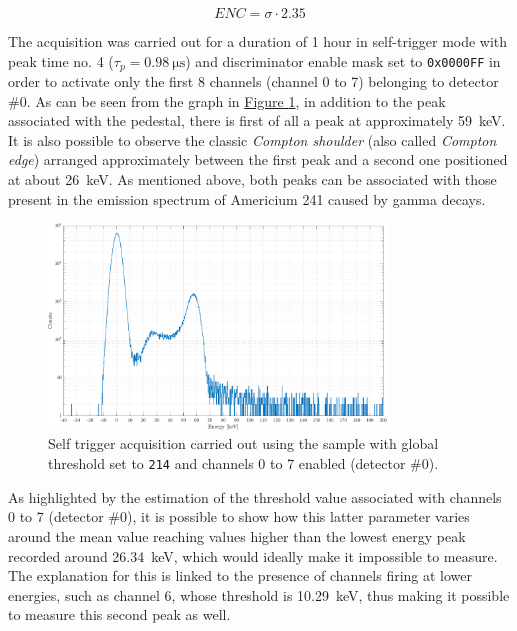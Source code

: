 \vspace{0.15cm}

\begin{equation}
    ENC = \sigma \cdot 2.35
    \label{ENCchargeScan}
\end{equation}

\par
The acquisition was carried out for a duration of 1 hour in self-trigger mode with peak time no. 4 ($\tau_{p} = \SI{0.98}{\micro\second}$) and discriminator enable mask set to \texttt{0x0000FF} in order to activate only the first 8 channels (channel 0 to 7) belonging to detector \#0. As can be seen from the graph in \hyperref[figAmericioTHR214]{Figure \ref{figAmericioTHR214}}, in addition to the peak associated with the pedestal, there is first of all a peak at approximately \SI{59}{\kilo\electronvolt}. It is also possible to observe the classic \textit{Compton shoulder} (also called \textit{Compton edge}) arranged approximately between the first peak and a second one positioned at about \SI{26}{\kilo\electronvolt}. As mentioned above, both peaks can be associated with those present in the emission spectrum of Americium 241 caused by gamma decays.

\begin{figure}[h!]
    \centering
    \includegraphics[width=0.8\textwidth]{Images/chap3/results/americio/ch4_americio_log.pdf}
    \caption{Self trigger acquisition carried out using the  sample with global threshold set to \texttt{214} and channels 0 to 7 enabled (detector \#0).}
    \label{figAmericioTHR214}
\end{figure}

\par
As highlighted by the estimation of the threshold value associated with channels 0 to 7 (detector \#0), it is possible to show how this latter parameter varies around the mean value reaching values higher than the lowest energy peak recorded around \SI{26.34}{\kilo\electronvolt}, which would ideally make it impossible to measure. The explanation for this is linked to the presence of channels firing at lower energies, such as channel 6, whose threshold is \SI{10.29}{\kilo\electronvolt}, thus making it possible to measure this second peak as well.

